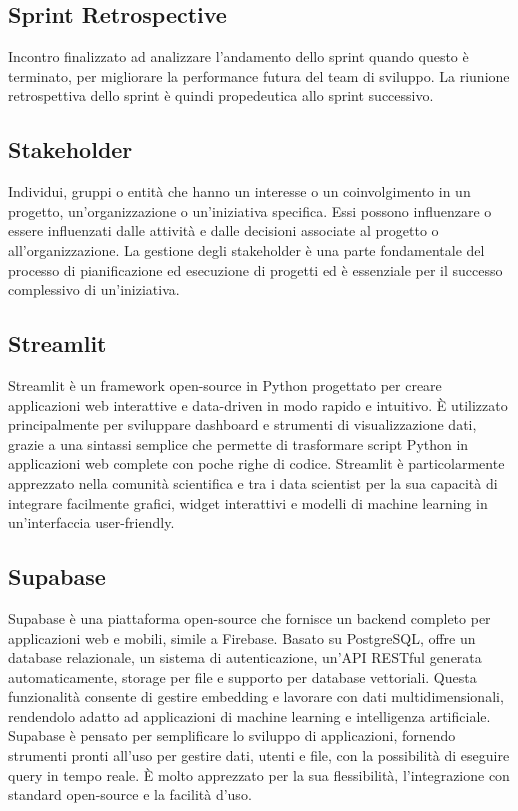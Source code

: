 \hypertarget{sec:sprint_reptrospective}{}
\subsection*{Sprint Retrospective}
Incontro finalizzato ad analizzare l’andamento dello sprint quando questo è terminato, per migliorare la performance futura del team di sviluppo. La 
riunione retrospettiva dello sprint è quindi propedeutica allo sprint successivo.

\hypertarget{sec:stakeholder}{}
\subsection*{Stakeholder}
Individui, gruppi o entità che hanno un interesse o un coinvolgimento in un progetto, un’organizzazione o un’iniziativa specifica. Essi possono influenzare 
o essere influenzati dalle attività e dalle decisioni associate al progetto o all’organizzazione. La gestione degli stakeholder è una parte fondamentale del 
processo di pianificazione ed esecuzione di progetti ed è essenziale per il successo complessivo di un’iniziativa.

\hypertarget{sec:streamlit}{}
\subsection*{Streamlit}
Streamlit è un framework open-source in Python progettato per creare applicazioni web interattive e data-driven in modo rapido e intuitivo. È utilizzato 
principalmente per sviluppare dashboard e strumenti di visualizzazione dati, grazie a una sintassi semplice che permette di trasformare script Python in 
applicazioni web complete con poche righe di codice. Streamlit è particolarmente apprezzato nella comunità scientifica e tra i data scientist per la sua 
capacità di integrare facilmente grafici, widget interattivi e modelli di machine learning in un'interfaccia user-friendly.

\hypertarget{sec:supabase}{}
\subsection*{Supabase}
Supabase è una piattaforma open-source che fornisce un backend completo per applicazioni web e mobili, simile a Firebase. Basato su PostgreSQL, offre un 
database relazionale, un sistema di autenticazione, un'API RESTful generata automaticamente, storage per file e supporto per database vettoriali. Questa 
funzionalità consente di gestire embedding e lavorare con dati multidimensionali, rendendolo adatto ad applicazioni di machine learning e intelligenza 
artificiale. Supabase è pensato per semplificare lo sviluppo di applicazioni, fornendo strumenti pronti all'uso per gestire dati, utenti e file, con la 
possibilità di eseguire query in tempo reale. È molto apprezzato per la sua flessibilità, l'integrazione con standard open-source e la facilità d'uso.

